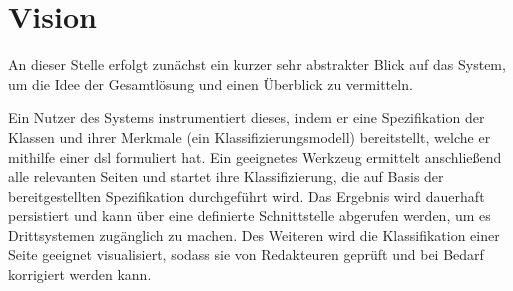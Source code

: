 \section{Vision}
    An dieser Stelle erfolgt zunächst ein kurzer sehr abstrakter Blick auf das System,
    um die Idee der Gesamtlösung und einen Überblick zu vermitteln.

    Ein Nutzer des Systems instrumentiert dieses,
    indem er eine Spezifikation der Klassen und ihrer Merkmale (ein Klassifizierungsmodell) bereitstellt,
    welche er mithilfe einer \gls{dsl} formuliert hat.
    Ein geeignetes Werkzeug ermittelt anschließend alle relevanten Seiten und startet ihre Klassifizierung,
    die auf Basis der bereitgestellten Spezifikation durchgeführt wird.
    Das Ergebnis wird dauerhaft persistiert und kann über eine definierte Schnittstelle
    abgerufen werden, um es Drittsystemen zugänglich zu machen.
    Des Weiteren wird die Klassifikation einer Seite geeignet visualisiert,
    sodass sie von Redakteuren geprüft und bei Bedarf korrigiert werden kann.
